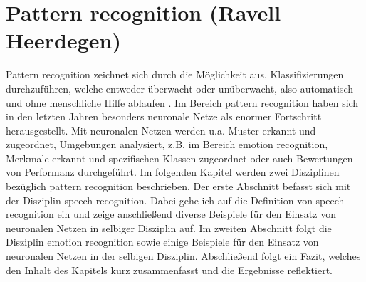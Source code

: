 \section{Pattern recognition (Ravell Heerdegen)}
Pattern recognition zeichnet sich durch die Möglichkeit aus, Klassifizierungen durchzuführen, welche entweder überwacht oder unüberwacht, also automatisch und ohne menschliche Hilfe ablaufen \cite{svmgmm}. Im Bereich pattern recognition haben sich in den letzten Jahren besonders neuronale Netze als enormer Fortschritt herausgestellt. Mit neuronalen Netzen werden u.a. Muster erkannt und zugeordnet, Umgebungen analysiert, z.B. im Bereich emotion recognition, Merkmale erkannt und spezifischen Klassen zugeordnet oder auch Bewertungen von Performanz durchgeführt.\cite{patternrec}
Im folgenden Kapitel werden zwei Disziplinen bezüglich pattern recognition beschrieben. Der erste Abschnitt befasst sich mit der Disziplin speech recognition. Dabei gehe ich auf die Definition von speech recognition ein und zeige anschließend diverse Beispiele für den Einsatz von neuronalen Netzen in selbiger Disziplin auf.
Im zweiten Abschnitt folgt die Disziplin emotion recognition sowie einige Beispiele für den Einsatz von neuronalen Netzen in der selbigen Disziplin. Abschließend folgt ein Fazit, welches den Inhalt des Kapitels kurz zusammenfasst und die Ergebnisse reflektiert.